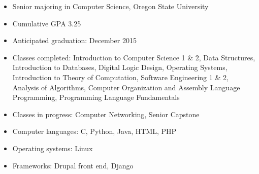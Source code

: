 \documentclass[11pt]{article}
\begin{document}
\begin{itemize}
    \item Senior majoring in Computer Science, Oregon State University 

    \item Cumulative GPA 3.25

    \item Anticipated graduation: December 2015

    \item Classes completed: Introduction to Computer Science 1 \& 2, Data Structures, Introduction to Databases, Digital Logic Design, Operating Systems, Introduction to Theory of Computation, Software Engineering 1 \& 2, Analysis of Algorithms, Computer Organization and Assembly Language Programming, Programming Language Fundamentals


    \item Classes in progress: Computer Networking, Senior Capstone
\end{itemize}

\begin{itemize}
  \item Computer languages: C, Python, Java, HTML, PHP

  \item Operating systems: Linux

  \item Frameworks: Drupal front end, Django
\end{itemize}
\end{document}
